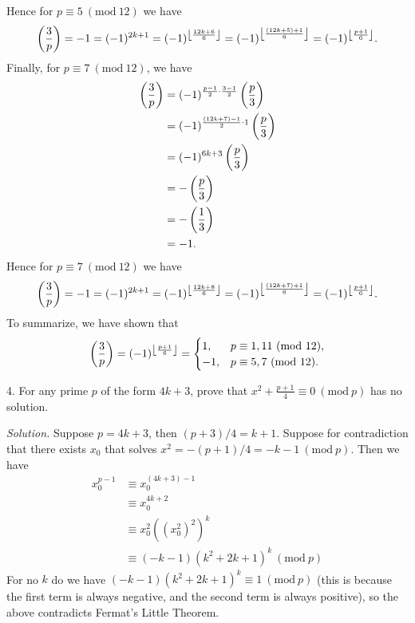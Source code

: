 \documentclass{article}
\newcommand{\Mod}[1]{\ (\mathrm{mod}\ #1)}
\newcommand{\Leg}[2]{\del{\frac{#1}{#2}}}
\DeclarePairedDelimiter\floor{\lfloor}{\rfloor}
\begin{document}
%
Hence for $p \equiv 5 \Mod{12}$ we have
%
\begin{equation*}
    \Leg{3}{p}
    = - 1
    = (-1)^{2 k + 1}
    = (-1)^{\floor*{\frac{12 k + 6}{6}}}
    = (-1)^{\floor*{\frac{(12 k + 5) + 1}{6}}}
    = (-1)^{\floor*{\frac{p + 1}{6}}}
    .
\end{equation*}
%
Finally, for $p \equiv 7 \Mod{12}$, we have
%
\begin{align*}
    \Leg{3}{p}
    &= (-1)^{\frac{p - 1}{2} \cdot \frac{3 - 1}{2}} \Leg{p}{3} \\
    &= (-1)^{\frac{(12 k + 7) - 1}{2} \cdot 1} \Leg{p}{3} \\
    &= (-1)^{6 k + 3} \Leg{p}{3} \\
    &= - \Leg{p}{3} \\
    &= - \Leg{1}{3} \\
    &= -1
    .
\end{align*}
%
Hence for $p \equiv 7 \Mod{12}$ we have
%
\begin{equation*}
    \Leg{3}{p}
    = - 1
    = (-1)^{2 k + 1}
    = (-1)^{\floor*{\frac{12 k + 8}{6}}}
    = (-1)^{\floor*{\frac{(12 k + 7) + 1}{6}}}
    = (-1)^{\floor*{\frac{p + 1}{6}}}
    .
\end{equation*}
%
To summarize, we have shown that
%
\begin{equation*}
    \Leg{3}{p}
    = (-1)^{\floor*{\frac{p + 1}{6}}}
    =
    \begin{cases}
        1, & p \equiv 1, 11 \Mod{12}, \\
        -1, & p \equiv 5, 7 \Mod{12}.
    \end{cases}
\end{equation*}


\newpage

4. For any prime $p$ of the form $4 k + 3$, prove that
$x^2 + \frac{p + 1}{4} \equiv 0 \Mod{p}$ has no solution.

\textit{Solution.}
Suppose $p = 4 k + 3$, then $(p + 3) / 4 = k + 1$. Suppose
for contradiction that there exists $x_0$ that solves
$x^2 = - (p + 1) / 4 = - k - 1 \Mod{p}$. Then we have
%
\begin{align*}
    x_0^{p - 1}
    &\equiv x_0^{(4k + 3) - 1} \\
    &\equiv x_0^{4k + 2} \\
    &\equiv x_0^2 ((x_0^2)^2)^k \\
    &\equiv (-k - 1) (k^2 + 2k + 1)^k
    \Mod{p}
\end{align*}
%
For no $k$ do we have $(-k - 1) (k^2 + 2k + 1)^k \equiv 1 \Mod{p}$
(this is because the first term is always negative, and the second
term is always positive), so the above contradicts Fermat's Little Theorem.
\end{document}
